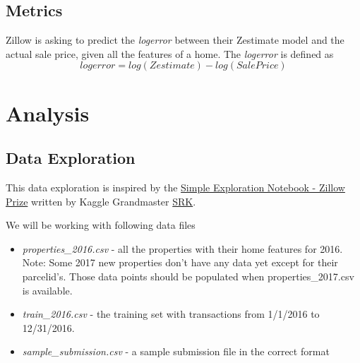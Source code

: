 \documentclass[a4paper]{article}
\begin{document}
\subsection{Metrics}
%
%
Zillow is asking to predict the \textit{logerror} between their Zestimate model and the
actual sale price, given all the features of a home. The \textit{logerror} is defined as
\[ logerror = log(Zestimate) - log(SalePrice) \]



\section{Analysis}

\subsection{Data Exploration}
This data exploration is inspired by the
\href{https://www.kaggle.com/sudalairajkumar/simple-exploration-notebook-zillow-prize}{Simple Exploration Notebook - Zillow Prize}
written by Kaggle Grandmaster \href{https://www.kaggle.com/sudalairajkumar}{SRK}.

We will be working with following data files
\begin{itemize}
    \item \textit{properties\_2016.csv} - all the properties with their home features for 2016. Note: Some 2017 new 
    properties don't have any data yet except for their parcelid's. Those data points should be populated when
    properties\_2017.csv is available.
    \item \textit{train\_2016.csv} - the training set with transactions from 1/1/2016 to 12/31/2016.
    \item \textit{sample\_submission.csv} - a sample submission file in the correct format
\end{itemize}
\end{document}
